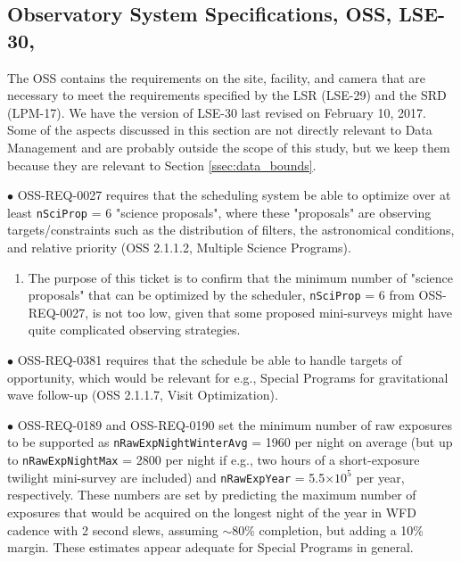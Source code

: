 \documentclass[DM,lsstdraft,toc]{lsstdoc}
\begin{document}
\subsection{Observatory System Specifications, OSS, LSE-30, \cite{LSE-30}}\label{ssec:docrev_oss}

The OSS contains the requirements on the site, facility, and camera that are necessary to meet the requirements specified by the LSR (LSE-29) and the SRD (LPM-17). We have the version of LSE-30 last revised on February 10, 2017. Some of the aspects discussed in this section are not directly relevant to Data Management and are probably outside the scope of this study, but we keep them because they are relevant to Section \ref{ssec:data_bounds}.

$\bullet$ OSS-REQ-0027 requires that the scheduling system be able to optimize over at least {\tt nSciProp} = 6 "science proposals", where these "proposals" are observing targets/constraints such as the distribution of filters, the astronomical conditions, and relative priority (OSS 2.1.1.2, Multiple Science Programs).
\begin{enumerate}[resume,topsep=-10pt,after=\vspace{10pt},label= \textbf{Action \Roman*}] \item \label{OSS-1} The purpose of this ticket is to confirm that the minimum number of "science proposals" that can be optimized by the scheduler, {\tt nSciProp} = 6 from OSS-REQ-0027, is not too low, given that some proposed mini-surveys might have quite complicated observing strategies. \end{enumerate} %

$\bullet$ OSS-REQ-0381 requires that the schedule be able to handle targets of opportunity, which would be relevant for e.g., Special Programs for gravitational wave follow-up (OSS 2.1.1.7, Visit Optimization).

$\bullet$ OSS-REQ-0189 and OSS-REQ-0190 set the minimum number of raw exposures to be supported as {\tt nRawExpNightWinterAvg} = 1960 per night on average (but up to {\tt nRawExpNightMax} = 2800 per night if e.g., two hours of a short-exposure twilight mini-survey are included) and {\tt nRawExpYear} = 5.5$\times10^5$ per year, respectively. These numbers are set by predicting the maximum number of exposures that would be acquired on the longest night of the year in WFD cadence with 2 second slews, assuming $\sim80\%$ completion, but adding a 10\% margin. These estimates appear adequate for Special Programs in general.
\end{document}
